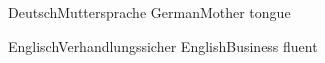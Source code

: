 

\begin{cventries}
    \msinglecventry%
    {Deutsch}{Muttersprache}{}%
    {German}{Mother tongue}{}

    \msinglecventry%
    {Englisch}{Verhandlungssicher}{}%
    {English}{Business fluent}{}
\end{cventries}